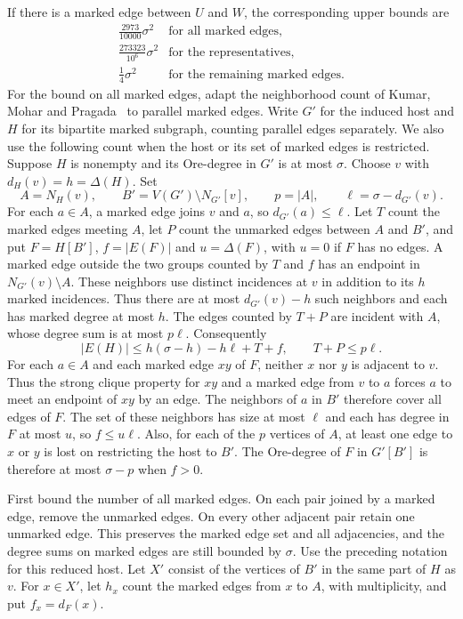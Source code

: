 \documentclass[preprint,11pt,numbers]{elsarticle-arxiv}
\numberwithin{equation}{section}
\theoremstyle{definition}
\begin{document}
If there is a marked edge between $U$ and $W$, the corresponding
upper bounds are
\[
 \begin{array}{ll}
 \frac{2973}{10000}\sigma^2 & \text{for all marked edges},\\
 \frac{273323}{10^6}\sigma^2 & \text{for the representatives},\\
 \frac{1}{4}\sigma^2 & \text{for the remaining marked edges}.
 \end{array}
\]
For the bound on all marked edges, adapt the neighborhood count
of Kumar, Mohar and Pragada~\cite{KumarMoharPragada2026}
to parallel marked edges. Write $G'$ for the induced host and
$H$ for its bipartite marked subgraph, counting parallel edges
separately. We also use the following count when the host or its
set of marked edges is restricted. Suppose $H$ is nonempty and its
Ore-degree in $G'$ is at most $\sigma$. Choose $v$ with
$d_H(v)=h=\Delta(H)$. Set
\[
 A=N_H(v),\qquad B'=V(G')\setminus N_{G'}[v],
 \qquad p=|A|,\qquad \ell=\sigma-d_{G'}(v).
\]
For each $a\in A$, a marked edge joins $v$ and $a$, so
$d_{G'}(a)\leq\ell$. Let $T$ count the marked edges meeting $A$,
let $P$ count the unmarked edges between $A$ and $B'$, and put
$F=H[B']$, $f=|E(F)|$ and $u=\Delta(F)$, with $u=0$ if $F$ has
no edges. A marked edge outside the two groups counted by $T$
and $f$ has an endpoint in $N_{G'}(v)\setminus A$. These neighbors
use distinct incidences at $v$ in addition to its $h$ marked
incidences. Thus there are at most $d_{G'}(v)-h$ such neighbors
and each has marked degree at most $h$. The edges counted by
$T+P$ are incident with $A$, whose degree sum is at most $p\ell$.
Consequently
\[
 |E(H)|\leq h(\sigma-h)-h\ell+T+f,\qquad T+P\leq p\ell .
\]
For each $a\in A$ and each marked edge $xy$ of $F$, neither $x$
nor $y$ is adjacent to $v$. Thus the strong clique property for
$xy$ and a marked edge from $v$ to $a$ forces $a$ to meet an
endpoint of $xy$ by an edge. The neighbors of $a$ in $B'$
therefore cover all edges of $F$. The set of these neighbors
has size at most $\ell$ and each has degree in $F$ at most $u$,
so $f\leq u\ell$. Also, for each of the $p$ vertices of $A$,
at least one edge to $x$ or $y$ is lost on restricting the host
to $B'$. The Ore-degree of $F$ in $G'[B']$ is therefore at most
$\sigma-p$ when $f>0$.

First bound the number of all marked edges. On each pair joined
by a marked edge, remove the unmarked edges. On every other
adjacent pair retain one unmarked edge. This preserves the marked
edge set and all adjacencies, and the degree sums on marked edges
are still bounded by $\sigma$. Use the preceding notation for
this reduced host. Let $X'$ consist of the vertices of $B'$ in
the same part of $H$ as $v$. For $x\in X'$, let $h_x$ count the
marked edges from $x$ to $A$, with multiplicity, and put
$f_x=d_F(x)$.
\end{document}
